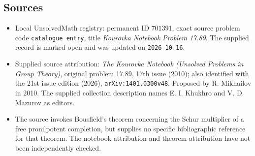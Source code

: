 \documentclass[11pt]{article}
\begin{document}
\subsection{Sources}
\begin{itemize}
\item Local UnsolvedMath registry: permanent ID \(701391\), exact source problem code \texttt{catalogue entry}, title \emph{Kourovka Notebook Problem 17.89}. The supplied record is marked open and was updated on \texttt{2026-10-16}.
\item Supplied source attribution: \emph{The Kourovka Notebook (Unsolved Problems in Group Theory)}, original problem 17.89, 17th issue (2010); also identified with the 21st issue edition (2026), \texttt{arXiv:1401.0300v48}. Proposed by R. Mikhailov in 2010. The supplied collection description names E. I. Khukhro and V. D. Mazurov as editors.
\item The source invokes Bousfield's theorem concerning the Schur multiplier of a free pronilpotent completion, but supplies no specific bibliographic reference for that theorem. The notebook attribution and theorem attribution have not been independently checked.
\end{itemize}
\end{document}
